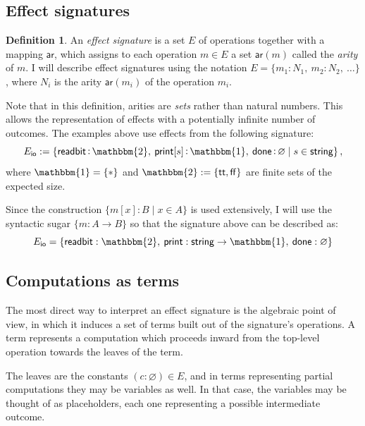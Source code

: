 \documentclass[11pt,oneside,draft]{book}
\theoremstyle{definition}
\newtheorem{definition}[theorem]{Definition}
\newcommand{\kw}[1]{\ensuremath{ \mathsf{#1} }}
\begin{document}

\subsection{Effect signatures} %

\begin{definition} \label{def:esig}
An \emph{effect signature}
is a set $E$ of operations
together with a mapping $\kw{ar}$,
which assigns to each operation $m \in E$ a set $\kw{ar}(m)$
called the \emph{arity} of $m$.
I will describe effect signatures using the notation
$E = \{ m_1 \mathop: N_1, \: m_2 \mathop: N_2, \: \ldots \}$,
where $N_i$ is the arity $\kw{ar}(m_i)$ of the operation $m_i$.
\end{definition}

Note that in this definition,
arities are \emph{sets} rather than natural numbers.
This allows the representation of effects
with a potentially infinite number of outcomes.
The examples above
use effects from the following signature:
\[
  E_\kw{io} :=
  \{ \kw{readbit} \mathop: \mathbbm{2}, \:
     \kw{print}[s] \mathop: \mathbbm{1}, \:
     \kw{done} \mathop: \varnothing \mid
     s \in \kw{string} \}
  \,,
\]
where $\mathbbm{1} = \{ * \}$ and $\mathbbm{2} := \{ \kw{tt}, \kw{ff} \}$
are finite sets of the expected size.

Since the construction
$\{ m[x] : B \mid x \in A \}$
is used extensively,
I will use the syntactic sugar
$\{ m : A \rightarrow B \}$
so that the signature above can be described as:
\[
  E_\kw{io} =
  \{ \kw{readbit} : \mathbbm{2}, \:
     \kw{print} : \kw{string} \rightarrow \mathbbm{1}, \:
     \kw{done} : \varnothing \}
\]


\subsection{Computations as terms} \label{sec:bg:terms} %

The most direct way to interpret an effect signature
is the algebraic point of view,
in which it induces a set of terms
built out of the signature's operations.
A term represents a computation which proceeds inward
from the top-level operation
towards the leaves of the term.

The leaves are the constants $(c \mathop: \varnothing) \in E$,
and in terms representing partial computations
they may be variables as well.
In that case,
the variables may be thought of as placeholders,
each one representing a possible intermediate outcome.
\end{document}
